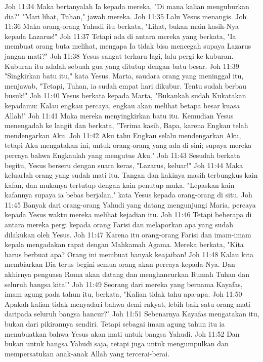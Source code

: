 Joh 11:34  Maka bertanyalah Ia kepada mereka, "Di mana kalian menguburkan dia?" "Mari lihat, Tuhan," jawab mereka.
Joh 11:35  Lalu Yesus menangis.
Joh 11:36  Maka orang-orang Yahudi itu berkata, "Lihat, bukan main kasih-Nya kepada Lazarus!"
Joh 11:37  Tetapi ada di antara mereka yang berkata, "Ia membuat orang buta melihat, mengapa Ia tidak bisa mencegah supaya Lazarus jangan mati?"
Joh 11:38  Yesus sangat terharu lagi, lalu pergi ke kuburan. Kuburan itu adalah sebuah gua yang ditutup dengan batu besar.
Joh 11:39  "Singkirkan batu itu," kata Yesus. Marta, saudara orang yang meninggal itu, menjawab, "Tetapi, Tuhan, ia sudah empat hari dikubur. Tentu sudah berbau busuk!"
Joh 11:40  Yesus berkata kepada Marta, "Bukankah sudah Kukatakan kepadamu: Kalau engkau percaya, engkau akan melihat betapa besar kuasa Allah!"
Joh 11:41  Maka mereka menyingkirkan batu itu. Kemudian Yesus menengadah ke langit dan berkata, "Terima kasih, Bapa, karena Engkau telah mendengarkan Aku.
Joh 11:42  Aku tahu Engkau selalu mendengarkan Aku, tetapi Aku mengatakan ini, untuk orang-orang yang ada di sini; supaya mereka percaya bahwa Engkaulah yang mengutus Aku."
Joh 11:43  Sesudah berkata begitu, Yesus berseru dengan suara keras, "Lazarus, keluar!"
Joh 11:44  Maka keluarlah orang yang sudah mati itu. Tangan dan kakinya masih terbungkus kain kafan, dan mukanya tertutup dengan kain penutup muka. "Lepaskan kain kafannya supaya ia bebas berjalan," kata Yesus kepada orang-orang di situ.
Joh 11:45  Banyak dari orang-orang Yahudi yang datang mengunjungi Maria, percaya kepada Yesus waktu mereka melihat kejadian itu.
Joh 11:46  Tetapi beberapa di antara mereka pergi kepada orang Farisi dan melaporkan apa yang sudah dilakukan oleh Yesus.
Joh 11:47  Karena itu orang-orang Farisi dan imam-imam kepala mengadakan rapat dengan Mahkamah Agama. Mereka berkata, "Kita harus berbuat apa? Orang ini membuat banyak keajaiban!
Joh 11:48  Kalau kita membiarkan Dia terus begini semua orang akan percaya kepada-Nya. Dan akhirnya penguasa Roma akan datang dan menghancurkan Rumah Tuhan dan seluruh bangsa kita!"
Joh 11:49  Seorang dari mereka yang bernama Kayafas, imam agung pada tahun itu, berkata, "Kalian tidak tahu apa-apa.
Joh 11:50  Apakah kalian tidak menyadari bahwa demi rakyat, lebih baik satu orang mati daripada seluruh bangsa hancur?"
Joh 11:51  Sebenarnya Kayafas mengatakan itu, bukan dari pikirannya sendiri. Tetapi sebagai imam agung tahun itu ia menubuatkan bahwa Yesus akan mati untuk bangsa Yahudi.
Joh 11:52  Dan bukan untuk bangsa Yahudi saja, tetapi juga untuk mengumpulkan dan mempersatukan anak-anak Allah yang tercerai-berai.
